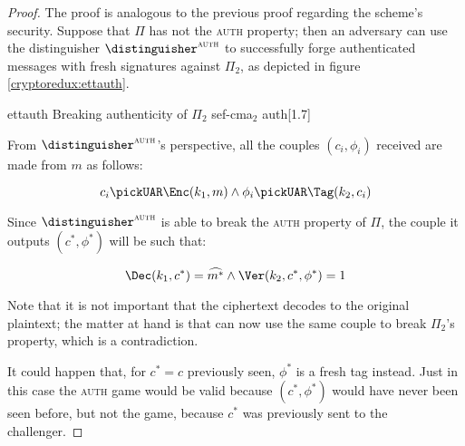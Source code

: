 \begin{proof}
    The proof is analogous to the previous proof regarding the scheme's \cpa{} security. Suppose that $\Pi$ has not the \textsc{auth} property; then an adversary can use the distinguisher $\distinguisher^{\textsc{auth}}$ to successfully forge authenticated messages with fresh signatures against $\Pi_2$, as depicted in figure \ref{cryptoredux:ettauth}.
    
    \begin{cryptoredux}
        {ettauth}
        {Breaking authenticity of $\Pi_2$}
        {sef-cma$_2$}
        {auth}[1.7]

        \cseqbeginloop


        \cseqendloop

        \cseqdelay



    \end{cryptoredux}

From $\distinguisher^{\textsc{auth}}$'s perspective, all the couples $(c_i, \phi_i)$ received are made from $m$ as follows:

\[
    c_i \pickUAR \Enc(k_1, m) \wedge \phi_i \pickUAR \Tag(k_2, c_i)
\]

Since $\distinguisher^{\textsc{auth}}$ is able to break the \textsc{auth} property of $\Pi$, the couple it outputs $(c^*, \phi^*)$ will be such that:

\[
    \Dec(k_1, c^*) = \widehat{m^*} \wedge \Ver(k_2, c^*, \phi^*) = 1
\]

Note that it is not important that the ciphertext decodes to the original plaintext; the matter at hand is that \adversary{} can now use the same couple to break $\Pi_2$'s \ufcma{} property, which is a contradiction.

It could happen that, for $c^* = c$ previously seen, $\phi^*$ is a fresh tag instead. Just in this case the \textsc{auth} game would be valid because $(c^*, \phi^*)$ would have never been seen before, but not the \sefcma{} game, because $c^*$ was previously sent to the challenger.
\end{proof}
    

